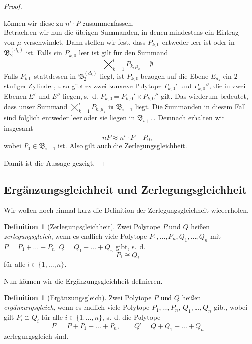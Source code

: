 \documentclass[11pt,titlepage]{article}
\theoremstyle{definition}
\newtheorem{definition}[theorem]{Definition}
\theoremstyle{remark}
\begin{document}
\begin{proof}
\begin{enumerate}
			können wir diese zu $n^i \cdot P$ zusammenfassen. \\
			Betrachten wir nun die übrigen Summanden, in denen mindestens 
			ein Eintrag von $\mu$ verschwindet. Dann stellen wir fest, dass 
			$P_{k,0}$ entweder leer ist oder in $\mathfrak{B}_2^{(d_k)}$ ist. 
			Falls ein $P_{k,0}$ leer ist gilt für den Summand
			\[\bigtimes_{k=1}^i P_{k,\mu_k}=\emptyset\]
			Falls $P_{k,0}$ stattdessen in $\mathfrak{B}_2^{(d_k)}$ liegt, 
			ist $P_{k,0}$ bezogen auf die Ebene $E_{d_k}$ ein $2$-stufiger 
			Zylinder, also gibt es zwei konvexe Polytope $P_{k,0}'$ 
			und $P_{k,0}''$, die in zwei Ebenen $E'$ und $E''$ liegen, s.~d. 
			$P_{k,0}=P_{k,0}'\times P_{k,0}''$ gilt. 
			Das wiederum bedeutet, dass unser Summand 
			$\bigtimes_{k=1}^i P_{k,\mu_k}$ in $\mathfrak{B}_{i+1}$ liegt. 
			Die Summanden in diesem Fall sind folglich entweder leer oder sie 
			liegen in $\mathfrak{B}_{i+1}$.
			Demnach erhalten wir insgesamt
			\[nP\approx n^i\cdot P + P_0,\]
			wobei $P_0\in \mathfrak{B}_{i+1}$ ist. Also gilt auch 
			die Zerlegungsgleichheit.
		\end{enumerate}
		Damit ist die Aussage gezeigt.
	\end{proof}
	
	\subsection{Ergänzungsgleichheit und Zerlegungsgleichheit}
	
	Wir wollen noch einmal kurz die Definition der Zerlegungsgleichheit wiederholen.
	
	\begin{definition}[Zerlegungsgleichheit]
		Zwei Polytope $P$ und $Q$ heißen \textsl{zerlegungsgleich}, wenn es endlich viele Polytope 
		$P_1,\ldots,P_n,Q_1,\ldots,Q_n$ mit $P=P_1 +\ldots +P_n$,  $Q=Q_1 +\ldots+Q_n$ 
		gibt, s.~d. 
		\[P_i\cong Q_i\]
		für alle $i\in\{1,\ldots,n\}$.
	\end{definition}
	
	Nun können wir die Ergänzungsgleichheit definieren.
	
	\begin{definition}[Ergänzungsgleich]
		Zwei Polytope $P$ und $Q$ heißen \textsl{ergänzungsgleich}, wenn es endlich viele Polytope 
		$P_1,\ldots,P_n$, $Q_1,\ldots,Q_n$ gibt, wobei gilt $P_i\cong Q_i$ für alle $i\in\{1,\ldots,n\}$, s.~d. die Polytope
		\[P'=P+P_1+\ldots+P_n,\qquad Q'=Q+Q_1+\ldots+Q_n\]
		zerlegungsgleich sind.
	\end{definition}
	
\end{document}
